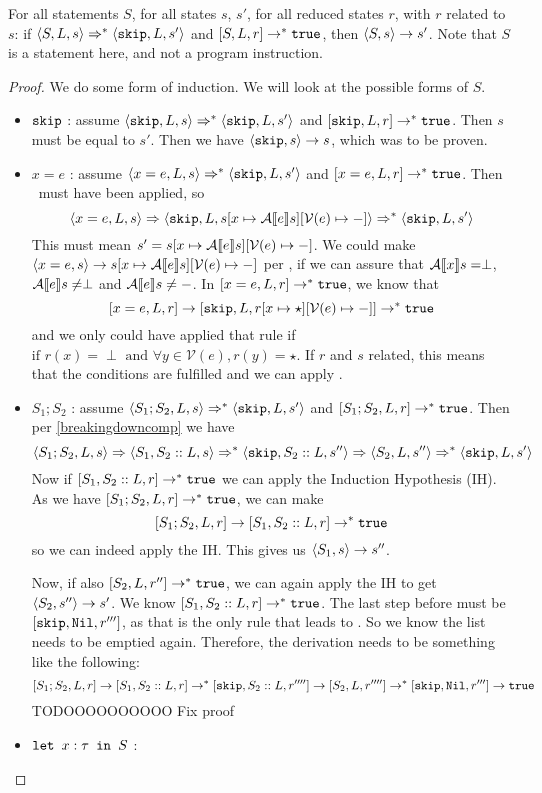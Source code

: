 \begin{lemma}
\label{sosimpns}
For all statements $S$, for all states $s$, $s'$, for all reduced states $r$, with $r$ related to $s$: if $\langle S, L, s \rangle \Rightarrow ^{*} \langle \texttt{skip}, L, s' \rangle$ and $[ S, L, r ] \to^{*} \texttt{true}$, then $\langle S, s \rangle \to s'$. Note that $S$ is a statement here, and not a program instruction. 
\end{lemma}
\begin{proof}
We do some form of induction. We will look at the possible forms of $S$.
\begin{itemize}[noitemsep]
\item $\texttt{skip}$ : assume $\langle \texttt{skip}, L, s \rangle \Rightarrow ^{*} \langle \texttt{skip}, L, s' \rangle$ and $[ \texttt{skip}, L, r ] \to^{*} \texttt{true}$. Then $s$ must be equal to $s'$. Then we have $\langle \texttt{skip}, s \rangle \to s$, which was to be proven. 
\item $x = e$ : assume $\langle x=e, L, s \rangle \Rightarrow^{*} \langle \texttt{skip}, L, s' \rangle$ and $[ x=e, L, r ] \to^{*} \texttt{true}$. Then \asssos ~must have been applied, so 
$$\langle x=e, L, s \rangle \Rightarrow \langle \texttt{skip}, L, s[x \mapsto \mathcal{A} \llbracket e \rrbracket s][\mathcal{V}(e)\mapsto-] \rangle \Rightarrow^{*} \langle \texttt{skip}, L, s' \rangle$$
This must mean $s' = s[x \mapsto \mathcal{A} \llbracket e \rrbracket s][\mathcal{V}(e)\mapsto-]$. We could make $\langle x=e, s \rangle \to s[x \mapsto \mathcal{A} \llbracket e \rrbracket s][\mathcal{V}(e)\mapsto-]$ per \assns, if we can assure that $\mathcal{A} \llbracket x \rrbracket s = \perp$, $\mathcal{A} \llbracket e \rrbracket s \neq \perp$ and $\mathcal{A} \llbracket e \rrbracket s \neq -$. In $[ x=e, L, r ] \to^{*} \texttt{true}$, we know that 
$$[ x=e, L, r ] \to [ \texttt{skip}, L, r[x \mapsto \star][\mathcal{V}(e)\mapsto-] ] \to^{*} \texttt{true}$$ 
and we only could have applied that rule if $\textrm{if }r(x) = \perp \textrm{ and } \forall y \in \mathcal{V}(e), r(y) = \star$. If $r$ and $s$ related, this means that the conditions are fulfilled and we can apply \assns. 
\item $S_1; S_2$ : assume $\langle S_1; S_2, L, s \rangle \Rightarrow^{*} \langle \texttt{skip}, L, s' \rangle$ and $[ S_1; S_2, L, r ] \to^{*} \texttt{true}$. Then per \ref{breakingdowncomp} we have 
$$\langle S_1; S_2, L, s \rangle \Rightarrow \langle S_1, S_2::L, s \rangle \Rightarrow ^{*} \langle \texttt{skip}, S_2::L, s'' \rangle \Rightarrow \langle S_2, L, s'' \rangle \Rightarrow ^{*} \langle \texttt{skip}, L, s' \rangle$$
Now if $[ S_1, S_2::L, r ] \to ^{*} \texttt{true}$ we can apply the Induction Hypothesis (IH). 
As we have $[ S_1; S_2, L, r ] \to^{*} \texttt{true}$, we can make
$$[ S_1; S_2, L, r ] \to [ S_1, S_2::L, r ] \to ^{*} \texttt{true}$$
so we can indeed apply the IH. 
This gives us $\langle S_1, s \rangle \to s''$. 

Now, if also $[ S_2, L, r'' ] \to ^{*} \texttt{true}$, we can again apply the IH to get $\langle S_2, s'' \rangle \to s'$. We know $[ S_1, S_2::L, r ] \to ^{*} \texttt{true}$. The last step before \tr must be $[ \texttt{skip}, \texttt{Nil}, r''' ]$, as that is the only rule that leads to \tr. So we know the list needs to be emptied again. Therefore, the derivation needs to be something like the following: 
$$[ S_1; S_2, L, r ] \to [ S_1, S_2::L, r ] \to^{*} [ \texttt{skip}, S_2::L, r'''' ] \to [ S_2, L, r'''' ] \to^{*} [ \texttt{skip}, \texttt{Nil}, r''' ] \to  \texttt{true}$$
TODOOOOOOOOOO Fix proof %
\item $\texttt{let }x : \tau \texttt{ in } S$ :
\end{itemize}
\end{proof}

